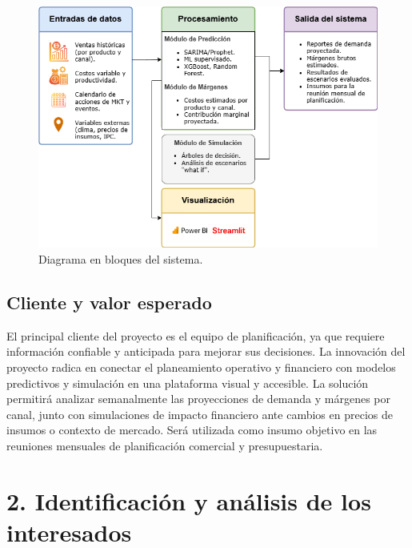 \documentclass[
11pt, %
]{charter}
\begin{document}
\vspace{15px}

\begin{figure}[htpb]
\centering 
\includegraphics[width=.65\textwidth]{./Figuras/Diagrama_proyecto.png}
\caption{Diagrama en bloques del sistema.}
\label{fig:diagBloques}
\end{figure}

\vspace{25px}


\subsection*{Cliente y valor esperado}
El principal cliente del proyecto es el equipo de planificación, ya que requiere información confiable y anticipada para mejorar sus decisiones. La innovación del proyecto radica en conectar el planeamiento operativo y financiero con modelos predictivos y simulación en una plataforma visual y accesible.
La solución permitirá analizar semanalmente las proyecciones de demanda y márgenes por canal, junto con simulaciones de impacto financiero ante cambios en precios de insumos o contexto de mercado. Será utilizada como insumo objetivo en las reuniones mensuales de planificación comercial y presupuestaria.

\section{2. Identificación y análisis de los interesados}
\label{sec:interesados}
\end{document}
